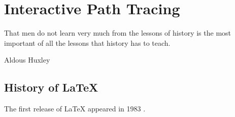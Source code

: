 \section{Interactive Path Tracing}
\label{ch:pathtracing}

\epigraph{That men do not learn very much from the lessons of history is the most important of all the lessons that history has to teach.}{Aldous Huxley}

\subsection{History of \LaTeX}

The first release of \LaTeX \cite{lamport1994latex} appeared in 1983 \cite{lamport2007writings}.

\cleardoublepage